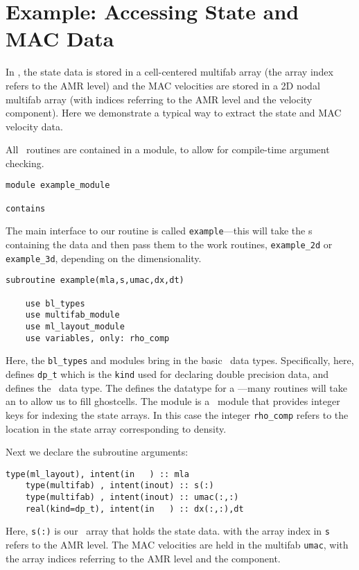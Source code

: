 \section{\label{sec:example} Example: Accessing State and MAC Data}

In \maestro, the state data is stored in a cell-centered multifab array
(the array index refers to the AMR level) and the MAC velocities are
stored in a 2D nodal multifab array (with indices referring to the AMR
level and the velocity component).  Here we demonstrate a typical way
to extract the state and MAC velocity data.

All \maestro\ routines are contained in a module, to allow for compile-time
argument checking.
\begin{lstlisting}[language={[95]fortran},mathescape=false]
module example_module

contains
\end{lstlisting}

The main interface to our routine is called {\tt example}---this will
take the \multifab s containing the data and then pass them to the
work routines, {\tt example\_2d} or {\tt example\_3d}, depending on
the dimensionality.  
\begin{lstlisting}[language={[95]fortran},mathescape=false]
  subroutine example(mla,s,umac,dx,dt)

    use bl_types
    use multifab_module
    use ml_layout_module
    use variables, only: rho_comp
\end{lstlisting}

\noindent Here, the {\tt bl\_types} and 
modules bring in the basic \amrex\ data types. Specifically, here,
 defines {\tt dp\_t} which is the {\tt kind} used for
declaring double precision data, and  defines
the \multifab\ data type.  The  defines the
datatype for a \mllayout---many routines will take an \mllayout to
allow us to fill ghostcells.  The  module is a
\maestro\ module that provides integer keys for indexing the state
arrays.  In this case the integer {\tt rho\_comp} refers to the
location in the state array corresponding to density.

Next we declare the subroutine arguments:

\begin{lstlisting}[language={[95]fortran},mathescape=false]
    type(ml_layout), intent(in   ) :: mla
    type(multifab) , intent(inout) :: s(:)
    type(multifab) , intent(inout) :: umac(:,:)
    real(kind=dp_t), intent(in   ) :: dx(:,:),dt
\end{lstlisting}
Here, {\tt s(:)} is our \multifab\ array that holds the state data.
with the array index in {\tt s} refers to the AMR level.  The MAC 
velocities are held in the multifab {\tt umac}, with the array
indices referring to the AMR level and the component.


